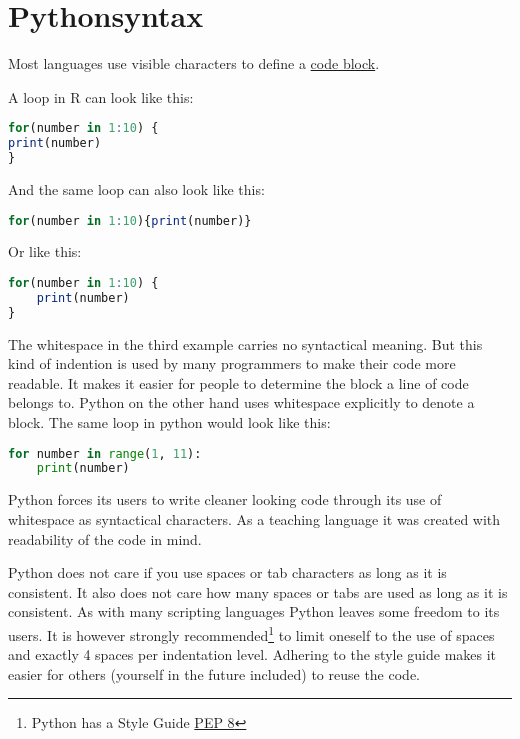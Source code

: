\documentclass{article}
\begin{document}
\section{Pythonsyntax}

Most languages use visible characters to define a
\href{https://en.wikipedia.org/wiki/Block_(programming)}{code block}.

A loop in R can look like this:

\begin{lstlisting}[language=R]
for(number in 1:10) {
print(number)
}
\end{lstlisting}

And the same loop can also look like this:

\begin{lstlisting}[language=R]
for(number in 1:10){print(number)}
\end{lstlisting}

Or like this:

\begin{lstlisting}[language=R]
for(number in 1:10) {
    print(number)
}
\end{lstlisting}


The whitespace in the third example carries no syntactical meaning.
But this kind of indention is used by many programmers to make their
code more readable.
It makes it easier for people to determine the block a line of code belongs to.
Python on the other hand uses whitespace explicitly to denote a block.
The same loop in python would look like this:

\begin{lstlisting}[language=Python]
for number in range(1, 11):
    print(number)
\end{lstlisting}

Python forces its users to write cleaner looking code through its use of whitespace
as syntactical characters.
As a teaching language it was created with readability of the code in mind.

Python does not care if you use spaces or tab characters as long as it is consistent.
It also does not care how many spaces or tabs are used as long as it is consistent.
As with many scripting languages Python leaves some freedom to its users.
It is however strongly recommended\footnote{
    Python has a Style Guide
\href{https://www.python.org/dev/peps/pep-0008/}{PEP 8}
}
to limit oneself to the use of spaces
and exactly 4 spaces per indentation level.
Adhering to the style guide makes it easier for others (yourself in the future included)
to reuse the code.
\end{document}
